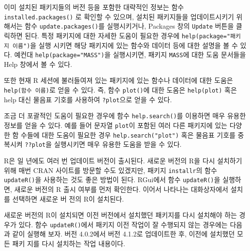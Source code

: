 \documentclass[
]{book}
\newenvironment{Shaded}{\begin{snugshade}}{\end{snugshade}}
\newcommand{\AttributeTok}[1]{\textcolor[rgb]{0.77,0.63,0.00}{#1}}
\newcommand{\FunctionTok}[1]{\textcolor[rgb]{0.00,0.00,0.00}{#1}}
\newcommand{\NormalTok}[1]{#1}
\newcommand{\OtherTok}[1]{\textcolor[rgb]{0.56,0.35,0.01}{#1}}
\newcommand{\SpecialCharTok}[1]{\textcolor[rgb]{0.00,0.00,0.00}{#1}}
\newcommand{\StringTok}[1]{\textcolor[rgb]{0.31,0.60,0.02}{#1}}
\begin{document}
이미 설치된 패키지들의 버전 등을 포함한 대략적인 정보는 함수
\texttt{installed.packages()} 로 확인할 수 있으며, 설치된 패키지들을
업데이트시키기 위해서는 함수 \texttt{update.packages()}를 실행시키거나,
Packages 창의 \texttt{Update} 버튼을 클릭하면 된다. 특정 패키지에 대한 자세한
도움이 필요한 경우에 \texttt{help(package="패키지\ 이름")}을 실행 시키면 해당
패키지에 있는 함수와 데이터 등에 대한 설명을 볼 수 있다. 예컨대
\texttt{help(package="MASS")}을 실행시키면, 패키지 \texttt{MASS}에 대한 도움 문서들을
Help 창에서 볼 수 있다.

또한 현재 R 세션에 불러들여져 있는 패키지에 있는 함수나 데이터에 대한
도움은 \texttt{help(함수\ 이름)}로 얻을 수 있다. 즉, 함수 \texttt{plot()}에 대한 도움은
\texttt{help(plot)} 혹은 help 대신 물음표 기호를 사용하여 \texttt{?plot}으로 얻을 수
있다.

조금 더 포괄적인 도움이 필요한 경우에 함수 \texttt{help.search()}를 이용하면
매우 유용한 정보를 얻을 수 있다. 예를 들어 문자열 \texttt{plot}이 포함된 여러
다른 패키지에 있는 다양한 함 수들에 대한 도움이 필요한 경우
\texttt{help.search("plot")} 혹은 물음표 기호를 중복시켜 \texttt{??plot}을 실행시키면
매우 유용한 도움을 받을 수 있다.

R은 일 년에도 여러 번 업데이트 버전이 출시된다. 새로운 버전의 R을 다시
설치하기 위해 매번 CRAN 사이트를 방문할 수도 있겠지만, 패키지
\texttt{installr}의 함수 \texttt{updateR()}을 사용하는 것도 좋은 방법이 된다. RGui에서
함수 \texttt{updateR()}을 실행하면, 새로운 버전의 R 출시 여부를 먼저 확인한다.
이어서 나타나는 대화상자에서 설치를 선택하면 새로운 버 전의 R이
설치된다.

새로운 버전의 R이 설치되면 이전 버전에서 설치했던 패키지를 다시 설치해야
하는 경 우가 있다. 함수 \texttt{updateR()}에서 패키지 이전 작업이 잘 수행되지
않는 경우에는 다음과 같이 실행해 보자. 버전 4.0.2에서 버전 4.1.2로
업데이트한 후, 이전에 설치했던 모든 패키 지를 다시 설치하는 작업
내용이다.

\begin{Shaded}
\end{Shaded}
\end{document}
